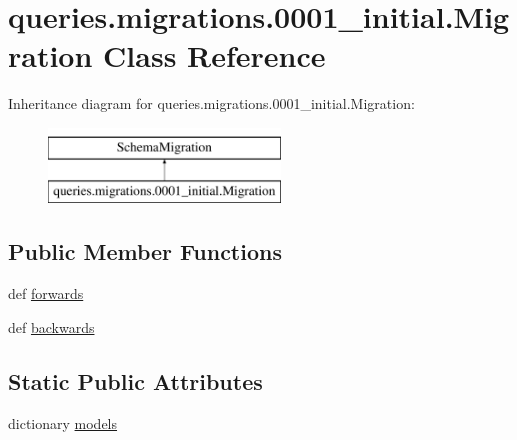 \hypertarget{classqueries_1_1migrations_1_10001__initial_1_1_migration}{\section{queries.\-migrations.0001\-\_\-initial.Migration Class Reference}
\label{classqueries_1_1migrations_1_10001__initial_1_1_migration}
}
Inheritance diagram for queries.\-migrations.0001\-\_\-initial.Migration\-:\begin{figure}[H]
\begin{center}
\leavevmode
\includegraphics[height=2.000000cm]{classqueries_1_1migrations_1_10001__initial_1_1_migration}
\end{center}
\end{figure}
\subsection*{Public Member Functions}
\begin{DoxyCompactItemize}
\item 
def \hyperlink{classqueries_1_1migrations_1_10001__initial_1_1_migration_a4d36f2985cf4dc8164766c4ef43dad34}{forwards}
\item 
def \hyperlink{classqueries_1_1migrations_1_10001__initial_1_1_migration_aa62686c6253c4970a630ad08e263b770}{backwards}
\end{DoxyCompactItemize}
\subsection*{Static Public Attributes}
\begin{DoxyCompactItemize}
\item 
dictionary \hyperlink{classqueries_1_1migrations_1_10001__initial_1_1_migration_a736c0d4a7a2e6f3983ce60a3087ee085}{models}
\end{DoxyCompactItemize}


